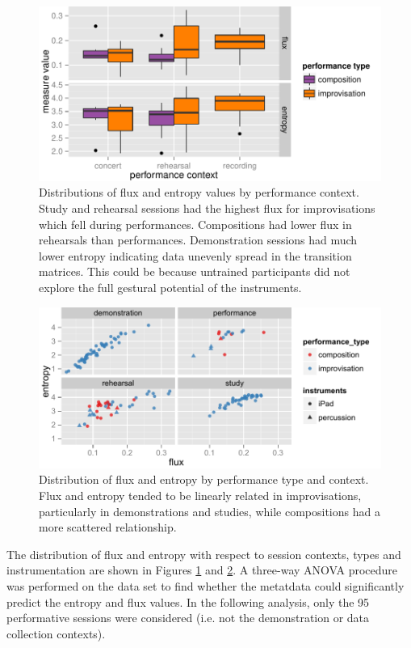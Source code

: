 \documentclass{sigchi}
\begin{document}
\begin{figure}
  \centering
  \includegraphics[width=\linewidth]{figures/context-flux-entropy-boxplot}
  \caption{Distributions of flux and entropy values by performance context. Study
    and rehearsal sessions had the highest flux for improvisations
    which fell during performances. Compositions had lower flux in
    rehearsals than performances. Demonstration sessions had much lower entropy
  indicating data unevenly spread in the transition matrices. This
  could be because untrained
  participants did not explore the full gestural potential of the
  instruments. 
  \label{fig:flux-entropy-boxplot}}
\end{figure}

\begin{figure}
  \centering
  \includegraphics[width=\linewidth]{figures/flux-entropy-distribution}
  \caption{Distribution of flux and entropy by performance type and
    context. Flux and entropy tended to be linearly related in
    improvisations, particularly in demonstrations and studies, while
    compositions had a more scattered relationship.
    \label{fig:flux-entropy-distribution}}
\end{figure}

The distribution of flux and entropy with respect to session contexts,
types and instrumentation are shown in Figures
\ref{fig:flux-entropy-boxplot} and
\ref{fig:flux-entropy-distribution}. A three-way ANOVA procedure was
performed on the data set to find whether the metatdata could
significantly predict the entropy and flux values. In the following
analysis, only the 95 performative sessions were considered (i.e. not
the demonstration or data collection contexts).
\end{document}
